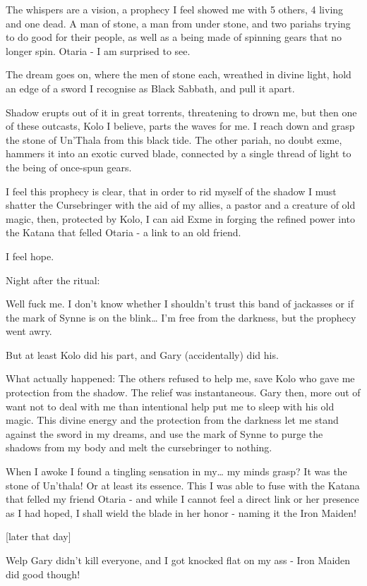 The whispers are a vision, a prophecy I feel showed me with 5 others, 4 living and one dead. A man of stone, a man from under stone, and two pariahs trying to do good for their people, as well as a being made of spinning gears that no longer spin. Otaria - I am surprised to see.\medskip

The dream goes on, where the men of stone each, wreathed in divine light, hold an edge of a sword I recognise as Black Sabbath, and pull it apart.\medskip

Shadow erupts out of it in great torrents, threatening to drown me, but then one of these outcasts, Kolo I believe, parts the waves for me. I reach down and grasp the stone of Un’Thala from this black tide. The other pariah, no doubt exme, hammers it into an exotic curved blade, connected by a single thread of light to the being of once-spun gears.\medskip

I feel this prophecy is clear, that in order to rid myself of the shadow I must shatter the Cursebringer with the aid of my allies, a pastor and a creature of old magic, then, protected by Kolo, I can aid Exme in forging the refined power into the Katana that felled Otaria - a link to an old friend.\medskip

I feel hope.\medskip

Night after the ritual:\medskip

Well fuck me. I don’t know whether I shouldn’t trust this band of jackasses or if the mark of Synne is on the blink… I’m free from the darkness, but the prophecy went awry.\medskip

But at least Kolo did his part, and Gary (accidentally) did his.\medskip

What actually happened: The others refused to help me, save Kolo who gave me protection from the shadow. The relief was instantaneous. Gary then, more out of want not to deal with me than intentional help put me to sleep with his old magic. This divine energy and the protection from the darkness let me stand against the sword in my dreams, and use the mark of Synne to purge the shadows from my body and melt the cursebringer to nothing.\medskip

When I awoke I found a tingling sensation in my… my minds grasp? It was the stone of Un’thala! Or at least its essence. This I was able to fuse with the Katana that felled my friend Otaria - and while I cannot feel a direct link or her presence as I had hoped, I shall wield the blade in her honor - naming it the Iron Maiden!\medskip

[later that day]\medskip

Welp Gary didn’t kill everyone, and I got knocked flat on my ass - Iron Maiden did good though!\medskip

\vspace*{5mm}
